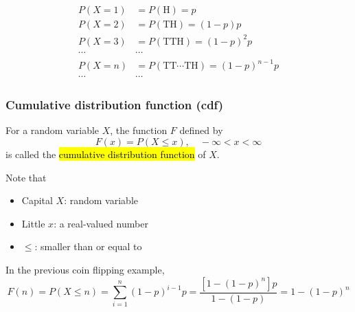\documentclass[slidestop,compress,mathserif]{beamer}
\begin{document}
\begin{frame}


\pause
\begin{align*}
P(X = 1) & = P(\text{H}) = p\\
P(X = 2) & = P(\text{TH}) = (1-p)p\\
P(X = 3) & = P(\text{TTH}) = (1-p)^2 p\\
 \cdots & \cdots \\
P(X = n) & = P(\text{TT} \cdots \text{TH}) = (1-p)^{n-1}p \\
 \cdots & \cdots
\end{align*}

\end{frame}


\begin{frame}\frametitle{Cumulative distribution function (cdf)}
\begin{defn}
For a random variable $X$, the function $F$ defined by
\[ F(x) = P(X \leq x), \quad  -\infty < x < \infty \]
is called the \hl{cumulative distribution function} of $X$.
\end{defn}

\pause
Note that
\begin{itemize}
\item Capital $X$: random variable
\item Little $x$: a real-valued number
\item $\leq$: smaller than or equal to
\end{itemize}

\pause
In the previous coin flipping example,
\[F(n) = P(X \leq n) = \sum_{i=1}^n (1-p)^{i-1} p = \frac{[1-(1-p)^n]p}{1-(1-p)} = 1- (1-p)^n\]

\end{frame}
\end{document}
